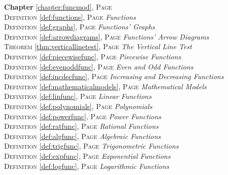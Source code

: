 
\begin{multicols}{2}
      \setlength{\parindent}{0pt}
      \footnotesize{

\textbf{Chapter} \ref{chapter:funcmod}, \textsc{Page} \pageref{chapter:funcmod} \\
\textsc{Definition} \ref{def:functions}, \textsc{Page} \pageref{def:functions} \textit{Functions} \\
\textsc{Definition} \ref{def:graphs}, \textsc{Page} \pageref{def:graphs} \textit{Functions' Graphs} \\
\textsc{Definition} \ref{def:arrowdiagrams}, \textsc{Page} \pageref{def:arrowdiagrams} \textit{Functions' Arrow Diagrams} \\
\textsc{Theorem} \ref{thm:verticallinetest}, \textsc{Page} \pageref{thm:verticallinetest} \textit{The Vertical Line Test} \\
\textsc{Definition} \ref{def:piecewisefunc}, \textsc{Page} \pageref{def:piecewisefunc} \textit{Piecewise Functions} \\
\textsc{Definition} \ref{def:evenoddfunc}, \textsc{Page} \pageref{def:evenoddfunc} \textit{Even and Odd Functions} \\
\textsc{Definition} \ref{def:incdecfunc}, \textsc{Page} \pageref{def:incdecfunc} \textit{Increasing and Decreasing Functions} \\
\textsc{Definition} \ref{def:mathematicalmodels}, \textsc{Page} \pageref{def:mathematicalmodels} \textit{Mathematical Models} \\
\textsc{Definition} \ref{def:linfunc}, \textsc{Page} \pageref{def:linfunc} \textit{Linear Functions} \\
\textsc{Definition} \ref{def:polynomials}, \textsc{Page} \pageref{def:polynomials} \textit{Polynomials} \\
\textsc{Definition} \ref{def:powerfunc}, \textsc{Page} \pageref{def:powerfunc} \textit{Power Functions} \\
\textsc{Definition} \ref{def:ratfunc}, \textsc{Page} \pageref{def:ratfunc} \textit{Rational Functions} \\
\textsc{Definition} \ref{def:algfunc}, \textsc{Page} \pageref{def:algfunc} \textit{Algebraic Functions} \\
\textsc{Definition} \ref{def:trigfunc}, \textsc{Page} \pageref{def:trigfunc} \textit{Trigonometric Functions} \\
\textsc{Definition} \ref{def:expfunc}, \textsc{Page} \pageref{def:expfunc} \textit{Exponential Functions} \\
\textsc{Definition} \ref{def:logfunc}, \textsc{Page} \pageref{def:logfunc} \textit{Logarithmic Functions} \\
}
\end{multicols}
